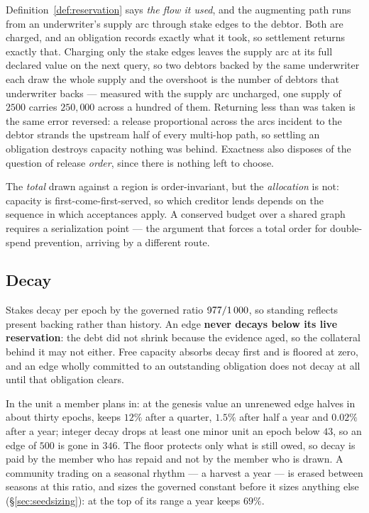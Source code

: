 \begin{remark}
\label{rem:charge-supply}
Definition~\ref{def:reservation} says \emph{the flow it used}, and the augmenting path
runs from an underwriter's supply arc through stake edges to the debtor. Both are charged,
and an obligation records exactly what it took, so settlement returns exactly that.
Charging only the stake edges leaves the supply arc at its full declared value on the next
query, so two debtors backed by the same underwriter each draw the whole supply and the
overshoot is the number of debtors that underwriter backs --- measured with the supply arc
uncharged, one supply of $2500$ carries $250{,}000$ across a hundred of them. Returning
less than was taken is the same error reversed: a release proportional across the arcs
incident to the debtor strands the upstream half of every multi-hop path, so settling an
obligation destroys capacity nothing was behind. Exactness also disposes of the question
of release \emph{order}, since there is nothing left to choose.
\end{remark}

\begin{remark}
\label{rem:order}
The \emph{total} drawn against a region is order-invariant, but the \emph{allocation} is
not: capacity is first-come-first-served, so which creditor lends depends on the
sequence in which acceptances apply. A conserved budget over a shared graph requires a
serialization point --- the argument that forces a total order for double-spend
prevention, arriving by a different route.
\end{remark}

\subsection{Decay}

Stakes decay per epoch by the governed ratio $977/1\,000$, so
standing reflects present backing rather than history. An edge \textbf{never decays
below its live reservation}: the debt did not shrink because the evidence aged, so the
collateral behind it may not either. Free capacity absorbs decay first and is floored at
zero, and an edge wholly committed to an outstanding obligation does not decay at all
until that obligation clears.

In the unit a member plans in: at the genesis value an unrenewed edge halves in about
thirty epochs, keeps $12\%$ after a quarter, $1.5\%$ after half a year and $0.02\%$ after
a year; integer decay drops at least one minor unit an epoch below $43$, so an edge of
$500$ is gone in $346$. The floor protects only what is still owed, so decay is paid by
the member who has repaid and not by the member who is drawn. A community trading on a
seasonal rhythm --- a harvest a year --- is erased between seasons at this ratio, and
sizes the governed constant before it sizes anything else (\S\ref{sec:seedsizing}): at the
top of its range a year keeps $69\%$.

